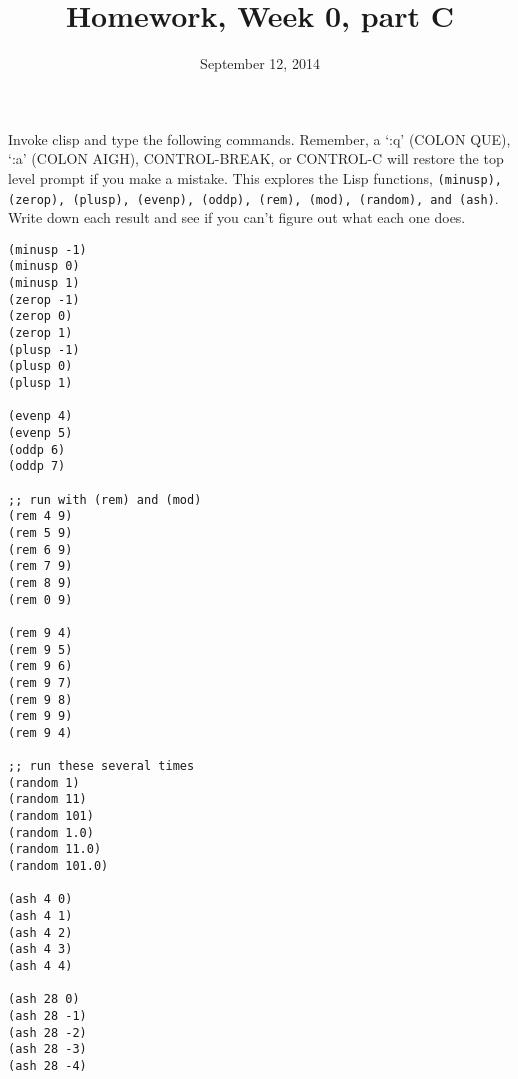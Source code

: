 \documentclass{article}
\title{Homework, Week 0, part C}
\date{September 12, 2014}
\begin{document}
\maketitle{}
\lstset{language=Lisp}

\paragraph{}Invoke clisp and type the following commands. Remember, a `:q' (COLON QUE), `:a' (COLON AIGH), CONTROL-BREAK, or CONTROL-C will restore the top level prompt if you make a mistake. This explores the Lisp functions, \texttt{(minusp), (zerop), (plusp), (evenp), (oddp), (rem), (mod), (random), and (ash)}. Write down each result and see if you can't figure out what each one does.\\

\begin{multicols}{2}
\begin{lstlisting}
(minusp -1)
(minusp 0)
(minusp 1)
(zerop -1)
(zerop 0)
(zerop 1)
(plusp -1)
(plusp 0)
(plusp 1)

(evenp 4)
(evenp 5)
(oddp 6)
(oddp 7)

;; run with (rem) and (mod)
(rem 4 9)
(rem 5 9)
(rem 6 9)
(rem 7 9)
(rem 8 9)
(rem 0 9)

(rem 9 4)
(rem 9 5)
(rem 9 6)
(rem 9 7)
(rem 9 8)
(rem 9 9)
(rem 9 4)

;; run these several times
(random 1)
(random 11)
(random 101)
(random 1.0)
(random 11.0)
(random 101.0)

(ash 4 0)
(ash 4 1)
(ash 4 2)
(ash 4 3)
(ash 4 4)

(ash 28 0)
(ash 28 -1)
(ash 28 -2)
(ash 28 -3)
(ash 28 -4)
\end{lstlisting}
\end{multicols}
\end{document}
